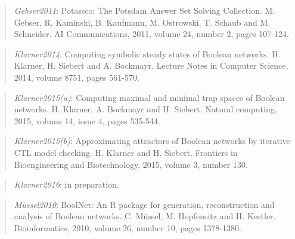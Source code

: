 \documentclass[letterpaper,10pt,english]{sphinxmanual}
\begin{document}
\label{Bibliography:gebser2011}\begin{quote}

\emph{Gebser2011}:
Potassco: The Potsdam Answer Set Solving Collection.
M. Gebser, R. Kaminski, B. Kaufmann, M. Ostrowski, T. Schaub and M. Schneider.
AI Communications, 2011, volume 24, number 2, pages 107-124.
\end{quote}
\label{Bibliography:klarner2014}\begin{quote}

\emph{Klarner2014}:
Computing symbolic steady states of Boolean networks.
H. Klarner, H. Siebert and A. Bockmayr.
Lecture Notes in Computer Science, 2014, volume 8751, pages 561-570.
\end{quote}
\label{Bibliography:klarner2015trap}\begin{quote}

\emph{Klarner2015(a)}:
Computing maximal and minimal trap spaces of Boolean networks.
H. Klarner, A. Bockmayr and H. Siebert.
Natural computing, 2015, volume 14, issue 4, pages 535-544.
\end{quote}
\label{Bibliography:klarner2015approx}\begin{quote}

\emph{Klarner2015(b)}:
Approximating attractors of Boolean networks by iterative CTL model checking.
H. Klarner and H. Siebert.
Frontiers in Bioengineering and Biotechnology, 2015, volume 3, number 130.
\end{quote}
\label{Bibliography:klarner2016basins}\begin{quote}

\emph{Klarner2016}:
in preparation.
\end{quote}
\label{Bibliography:mussel2010}\begin{quote}

\emph{Müssel2010}:
BoolNet: An R package for generation, reconstruction and analysis of Boolean networks.
C. Müssel, M. Hopfensitz and H. Kestler.
Bioinformatics, 2010, volume 26, number 10, pages 1378-1380.
\end{quote}
\end{document}
